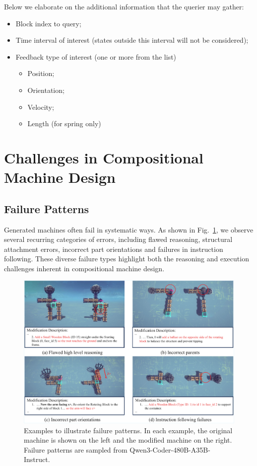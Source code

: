 Below we elaborate on the additional information that the querier may gather: \begin{itemize}
    \item Block index to query;
    \item Time interval of interest (states outside this interval will not be considered);
    \item Feedback type of interest (one or more from the list)
    \begin{itemize}
        \item Position;
        \item Orientation;
        \item Velocity;
        \item Length (for spring only)
    \end{itemize}
\end{itemize}








\clearpage
\newpage
\section{Challenges in Compositional Machine Design}

\subsection{Failure Patterns}

Generated machines often fail in systematic ways. As shown in Fig.~\ref{fig:failure-mode}, we observe several recurring categories of errors, including flawed reasoning, structural attachment errors, incorrect part orientations and failures in instruction following. These diverse failure types highlight both the reasoning and execution challenges inherent in compositional machine design.

\begin{figure}[h!]
  \centering
  \includegraphics[width=\linewidth]{figures/failure_mode_v3_cropped.pdf}
  \caption{\footnotesize Examples to illustrate failure patterns. In each example, the original machine is shown on the left and the modified machine on the right. Failure patterns are sampled from Qwen3-Coder-480B-A35B-Instruct.}
  \label{fig:failure-mode}
\end{figure}


